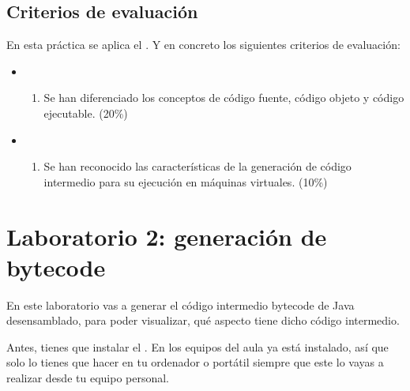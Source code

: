 \documentclass[letterpaper,10pt,spanish]{sphinxmanual}
\begin{document}
\section{Criterios de evaluación}
\label{\detokenize{lab1:criterios-de-evaluacion}}
\sphinxAtStartPar
En esta práctica se aplica el . Y en concreto los siguientes criterios de evaluación:
\begin{itemize}
\item {} \begin{enumerate}
%
\setcounter{enumi}{2}
\item {} 
\sphinxAtStartPar
Se han diferenciado los conceptos de código fuente, código objeto y código ejecutable. (20\%)

\end{enumerate}

\item {} \begin{enumerate}
%
\setcounter{enumi}{3}
\item {} 
\sphinxAtStartPar
Se han reconocido las características de la generación de código intermedio para su ejecución en máquinas virtuales. (10\%)

\end{enumerate}

\end{itemize}

\sphinxstepscope


\chapter{Laboratorio 2: generación de bytecode}
\label{\detokenize{lab2:laboratorio-2-generacion-de-bytecode}}\label{\detokenize{lab2::doc}}
\sphinxAtStartPar
En este laboratorio vas a generar el código intermedio bytecode de Java desensamblado, para poder visualizar, qué aspecto tiene dicho código intermedio.

\sphinxAtStartPar
Antes, tienes que instalar el . En los equipos del aula ya está instalado, así que solo lo tienes que hacer en tu ordenador o portátil siempre que este  lo vayas a realizar desde tu equipo personal.
\end{document}
